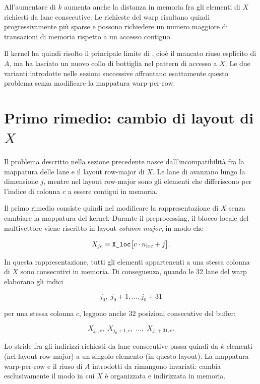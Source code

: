All'aumentare di $k$ aumenta anche la distanza in memoria fra gli elementi
di $X$ richiesti da lane consecutive. Le richieste del warp risultano
quindi progressivamente più sparse e possono richiedere un numero maggiore
di transazioni di memoria rispetto a un accesso contiguo.

Il kernel ha quindi risolto il principale limite di
, cioè il mancato riuso esplicito di $A$, ma ha
lasciato un nuovo collo di bottiglia nel pattern di accesso a $X$.
Le due varianti introdotte nelle sezioni successive affrontano esattamente
questo problema senza modificare la mappatura warp-per-row.

\section{Primo rimedio: cambio di layout di $X$}
\label{sec:x-layout}

Il problema descritto nella sezione precedente nasce dall'incompatibilità
fra la mappatura delle lane e il layout row-major di $X$. Le lane di
 avanzano lungo la dimensione $j$, mentre nel layout
row-major sono gli elementi che differiscono per l'indice di colonna $c$
a essere contigui in memoria.

Il primo rimedio consiste quindi nel modificare la rappresentazione di $X$
senza cambiare la mappatura del kernel. Durante il preprocessing, il blocco locale del multivettore viene riscritto
in layout \emph{column-major}, in modo che

\begin{equation}
X_{jc}
=
\texttt{X\_loc}\bigl[c \cdot n_{\text{loc}} + j\bigr].
\label{eq:xcol}
\end{equation}

In questa rappresentazione, tutti gli elementi appartenenti a una stessa
colonna di $X$ sono consecutivi in memoria. Di conseguenza, quando le 32
lane del warp elaborano gli indici

\[
j_0,\;j_0+1,\ldots,j_0+31
\]

per una stessa colonna $c$, leggono anche 32 posizioni consecutive del
buffer:

\[
X_{j_0,c},\;
X_{j_0+1,c},\;
\ldots,\;
X_{j_0+31,c}.
\]

Lo stride fra gli indirizzi richiesti da lane consecutive passa quindi da
$k$ elementi (nel layout row-major) a un singolo elemento (in questo layout).
La mappatura warp-per-row e il riuso di $A$ introdotti da 
rimangono invariati: cambia esclusivamente il modo in cui $X$ è organizzata
e indirizzata in memoria.






